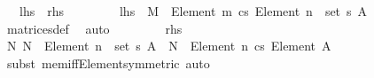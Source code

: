 \begin{isabellebody}
\ \ {\isacharparenleft}{\kern0pt}\ {\isachardoublequoteopen}{\isacharquery}{\kern0pt}lhs\ {\isasymlongleftrightarrow}\ {\isacharquery}{\kern0pt}rhs{\isachardoublequoteclose}{\isacharparenright}{\kern0pt}\isanewline
%
\isadelimproof
%
\endisadelimproof
%
\isatagproof
{}\isamarkupfalse%
\ {\isacharminus}{\kern0pt}\isanewline
\ \ \isamarkupfalse%
\isanewline
\ \ \ \ {\isachardoublequoteopen}{\isacharquery}{\kern0pt}lhs\ {\isasymlongleftrightarrow}\ M\ {\isacharcolon}{\kern0pt}\ Element\ {\isacharbrackleft}{\kern0pt}{}{\isacharcomma}{\kern0pt}{\isasymdots}{\isacharcomma}{\kern0pt}m{\isacharbrackleft}{\kern0pt}\ {\isasymrightarrow}cs\ Element\ {\isacharparenleft}{\kern0pt}{\isacharparenleft}{\kern0pt}{\isacharbrackleft}{\kern0pt}{}{\isacharcomma}{\kern0pt}{\isasymdots}{\isacharcomma}{\kern0pt}n{\isacharbrackleft}{\kern0pt}\ {\isacharcolon}{\kern0pt}{\isacharcolon}{\kern0pt}\ set{\isacharparenright}{\kern0pt}\ {\isasymrightarrow}s\ A{\isacharparenright}{\kern0pt}{\isachardoublequoteclose}\isanewline
\ \ \ \ \isamarkupfalse%
\ matrices{\isacharunderscore}{\kern0pt}def\ \isamarkupfalse%
\ auto\isanewline
\ \ \isamarkupfalse%
\ \isamarkupfalse%
\ {\isachardoublequoteopen}{\isachardot}{\kern0pt}{\isachardot}{\kern0pt}{\isachardot}{\kern0pt}\ \ {\isasymlongleftrightarrow}\ {\isacharquery}{\kern0pt}rhs{\isachardoublequoteclose}\isanewline
\ \ \isamarkupfalse%
\ {\isacharminus}{\kern0pt}\isanewline
\ \ \ \ \isamarkupfalse%
\ {\isachardoublequoteopen}{\isasymAnd}N{\isachardot}{\kern0pt}\ N\ {\isacharcolon}{\kern0pt}\ Element\ {\isacharparenleft}{\kern0pt}{\isacharparenleft}{\kern0pt}{\isacharbrackleft}{\kern0pt}{}{\isacharcomma}{\kern0pt}{\isasymdots}{\isacharcomma}{\kern0pt}n{\isacharbrackleft}{\kern0pt}\ {\isacharcolon}{\kern0pt}{\isacharcolon}{\kern0pt}\ set{\isacharparenright}{\kern0pt}\ {\isasymrightarrow}s\ A{\isacharparenright}{\kern0pt}\ {\isasymlongleftrightarrow}\ N\ {\isacharcolon}{\kern0pt}\ {\isacharparenleft}{\kern0pt}Element\ {\isacharbrackleft}{\kern0pt}{}{\isacharcomma}{\kern0pt}{\isasymdots}{\isacharcomma}{\kern0pt}n{\isacharbrackleft}{\kern0pt}\ {\isasymrightarrow}cs\ Element\ A{\isacharparenright}{\kern0pt}{\isachardoublequoteclose}\isanewline
\ \ \ \ \ \ \isamarkupfalse%
\ {\isacharparenleft}{\kern0pt}subst\ mem{\isacharunderscore}{\kern0pt}iff{\isacharunderscore}{\kern0pt}Element{\isacharbrackleft}{\kern0pt}symmetric{\isacharbrackright}{\kern0pt}{\isacharparenright}{\kern0pt}\ auto\isanewline

\end{isabellebody}
